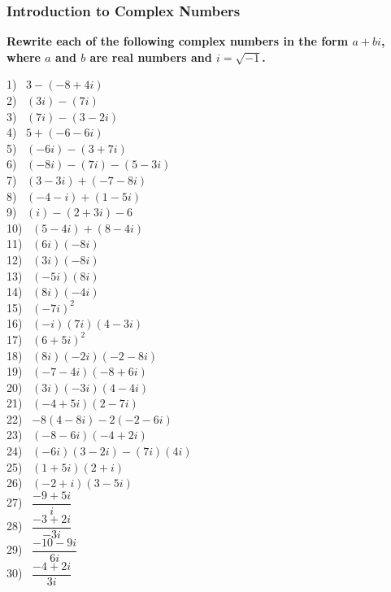 \documentclass[12pt]{book}
\theoremstyle{definition}
\begin{document}
\subsubsection{Introduction to Complex Numbers}

{\bf Rewrite each of the following complex numbers in the form $a+bi$, where $a$ and $b$ are real numbers and $i=\sqrt{-1}$.}

\begin{multicols}{3}
  1)~ $3 - (- 8 + 4 i)$\\
  2)~ $(3 i) - (7 i)$\\
  3)~ $(7 i) - (3 - 2 i)$\\
  4)~ $5 + (- 6 - 6 i)$\\
  5)~ $(- 6 i) - (3 + 7 i)$\\
  6)~ $(- 8 i) - (7 i) - (5 - 3 i)$\\
  7)~ $(3 - 3 i) + (- 7 - 8 i)$\\
  8)~ $(- 4 - i) + (1 - 5 i)$\\
  9)~ $(i) - (2 + 3 i) - 6$\\
  10)~ $(5 - 4 i) + (8 - 4 i)$\\
  11)~ $(6 i) (- 8 i)$\\
  12)~ $(3 i) (- 8 i)$\\
  13)~ $(- 5 i) (8 i)$\\
  14)~ $(8 i) (- 4 i)$\\
  15)~ $(- 7 i)^2$\\
  16)~ $(- i) (7 i) (4 - 3 i)$\\
  17)~ $(6 + 5 i)^2$\\
  18)~ $(8 i) (- 2 i) (- 2 - 8 i)$\\
  19)~ $(- 7 - 4 i) (- 8 + 6 i)$\\
  20)~ $(3 i) (- 3 i) (4 - 4 i)$\\
  21)~ $(- 4 + 5 i) (2 - 7 i)$\\
  22)~ $- 8 (4 - 8 i) - 2 (- 2 - 6 i)$\\
  23)~ $(- 8 - 6 i) (- 4 + 2 i)$\\
  24)~ $(- 6 i) (3 - 2 i) - (7 i) (4 i)$\\
  25)~ $(1 + 5 i) (2 + i)$\\
  26)~ $(- 2 + i) (3 - 5 i)$\\
  27)~ $\dfrac{- 9 + 5 i}{i}$\\
  28)~ $\dfrac{- 3 + 2 i}{- 3 i}$\\
  29)~ $\dfrac{- 10 - 9 i}{6 i}$\\
  30)~ $\dfrac{- 4 + 2 i}{3 i}$\\

\end{multicols}
\end{document}
